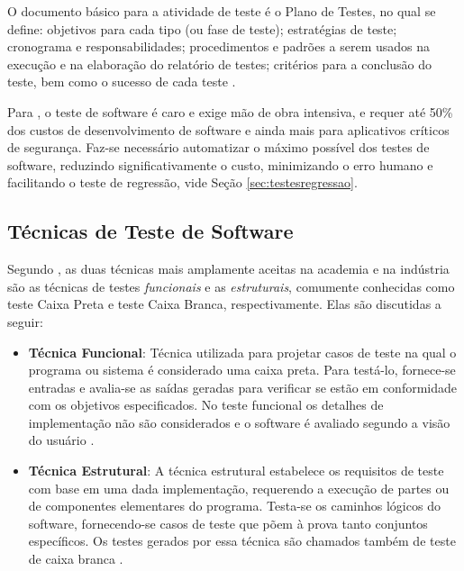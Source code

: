 O documento básico para a atividade de teste é o Plano de Testes, no qual se define: objetivos para cada tipo (ou fase de teste); estratégias de teste; cronograma e responsabilidades; procedimentos e padrões a serem usados na execução e na elaboração do relatório de testes; critérios para a conclusão do teste, bem como o sucesso de cada teste \cite{HIRAMA2011}.

Para , o teste de software é caro e exige mão de obra intensiva, e requer até 50\% dos custos de desenvolvimento de software e ainda mais para aplicativos críticos de segurança. Faz-se necessário automatizar o máximo possível dos testes de software, reduzindo significativamente o custo, minimizando o erro humano e facilitando o teste de regressão, vide Seção \ref{sec:testesregressao}.


\subsection{Técnicas de Teste de Software}


Segundo , as duas técnicas mais amplamente aceitas na academia e na indústria são as técnicas de testes \textit{funcionais} e as \textit{estruturais}, comumente conhecidas como teste Caixa Preta e teste Caixa Branca, respectivamente. Elas são discutidas a seguir:



\begin{itemize}
    \item \textbf{Técnica Funcional}: Técnica utilizada para projetar casos de teste na qual o programa ou sistema é considerado uma caixa preta. Para testá-lo, fornece-se entradas e avalia-se as saídas geradas para verificar se estão em conformidade com os objetivos especificados. No teste funcional os detalhes de implementação não são considerados e o software é avaliado segundo a visão do usuário \cite{DELAMARO2007}.
    
    \item \textbf{Técnica Estrutural}: A técnica estrutural estabelece os requisitos de teste com base em uma dada implementação, requerendo a execução de partes ou de componentes elementares do programa. Testa-se os caminhos lógicos do software, fornecendo-se casos de teste que põem à prova tanto conjuntos específicos. Os testes gerados por essa técnica são chamados também de teste de caixa branca \cite{DELAMARO2007}.
    
\end{itemize}

